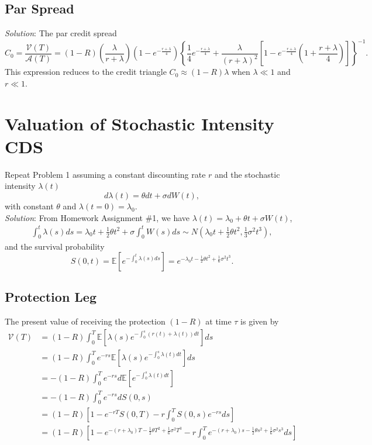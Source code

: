 \documentclass[paper=a4, fontsize=11pt]{scrartcl} %
\numberwithin{equation}{section} %
\numberwithin{figure}{section} %
\numberwithin{table}{section} %
\begin{document}
\subsection{Par Spread}
\textit{Solution}: The par credit spread
$$
C_0 = \frac{\mathcal{V}(T)}{\mathcal{A}(T)} = (1-R)\left(\frac{\lambda}{r+\lambda}\right)\left(1-e^{-\frac{r+\lambda}{4}}\right)\left\{ \frac{1}{4}e^{-\frac{r+\lambda}{4}} + \frac{\lambda}{(r+\lambda)^2}
\left[ 1 - e^{-\frac{r+\lambda}{4}} \left( 1+\frac{r+\lambda}{4} \right) \right]\right\}^{-1}.
$$
This expression reduces to the credit triangle $C_0 \approx (1-R)\lambda$ when $\lambda\ll 1$ and $r\ll 1$.

\newpage
\section{Valuation of Stochastic Intensity CDS}
Repeat Problem 1 assuming a constant discounting rate $r$ and the stochastic
intensity $\lambda(t)$
$$
d\lambda(t) = \theta dt +\sigma dW(t),
$$
with constant $\theta$ and $\lambda(t=0)=\lambda_0$.\\
\textit{Solution}: From Homework Assignment \#1, we have $ \lambda(t) = \lambda_0+ \theta t + \sigma W(t)$, 
\begin{align}
\nonumber \int_0^t \lambda(s)ds = \lambda_0 t + \frac{1}{2}\theta t^2 + \sigma\int_0^t W(s)ds
\sim N\left(\lambda_0 t + \frac{1}{2}\theta t^2, \frac{1}{3}\sigma^2 t^3\right),
\end{align}
and the survival probability
$$
S(0,t) = \mathbb{E}\left[e^{-\int_0^t \lambda(s)ds}\right] = e^{- \lambda_0 t - \frac{1}{2}\theta t^2 +\frac{1}{6}\sigma^2 t^3 }.
$$
\subsection{Protection Leg}
The present value of receiving the protection $(1-R)$ at time $\tau$ is given by
\begin{align*}
\mathcal{V}(T)  &= (1-R)\int_0^T  \mathbb{E}\left[ \lambda(s)e^{-\int_0^s \left(r(t)+\lambda(t)\right)dt}\right] ds \\
&= (1-R)\int_0^T e^{-rs} \mathbb{E}\left[ \lambda(s)e^{-\int_0^s \lambda(t)dt}\right] ds \\
&= -(1-R)\int_0^T e^{-rs} d\mathbb{E}\left[e^{-\int_0^s \lambda(t)dt}\right] \\
&= -(1-R)\int_0^T e^{-rs} d S(0,s) \\
&= (1-R)\left[ 1-e^{-rT}S(0,T) - r\int_0^T S(0,s)e^{-rs}ds \right]\\
&= (1-R)\left[ 1-e^{-( r+\lambda_0) T - \frac{1}{2}\theta T^2 +\frac{1}{6}\sigma^2 T^3 } - r\int_0^T e^{ -(r+\lambda_0) s - \frac{1}{2}\theta s^2 +\frac{1}{6}\sigma^2 s^3}ds \right]\\
\end{align*}
\end{document}
